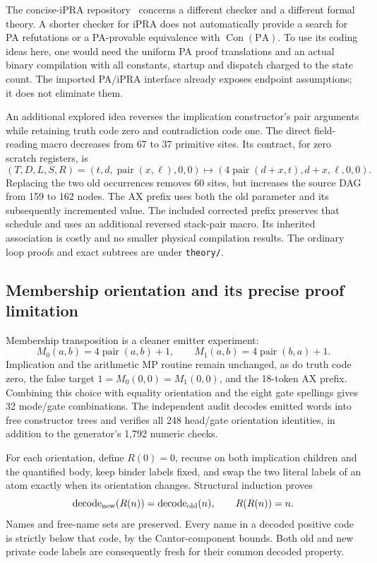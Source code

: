 \documentclass[11pt,letterpaper]{article}
\newcommand{\PA}{\mathrm{PA}}
\newcommand{\Con}{\operatorname{Con}}
\newcommand{\file}[1]{\texttt{\nolinkurl{#1}}}
\newcommand{\pair}{\operatorname{pair}}
\begin{document}
The concise-iPRA repository~\cite{ipra} concerns a different checker and a different
formal theory. A shorter checker for iPRA does not automatically provide a
search for PA refutations or a PA-provable equivalence with $\Con(\PA)$.
To use its coding ideas here, one would need the uniform PA proof
translations and an actual binary compilation with all constants, startup
and dispatch charged to the state count. The imported PA/iPRA interface
already exposes endpoint assumptions; it does not eliminate them.

An additional explored idea reverses the implication constructor's pair
arguments while retaining truth code zero and contradiction code one.
The direct field-reading macro decreases from 67 to 37 primitive sites.
Its contract, for zero scratch registers, is
\[
 (T,D,L,S,R)=(t,d,\pair(x,\ell),0,0)
 \longmapsto (4\pair(d+x,t),d+x,\ell,0,0).
\]
Replacing the two old occurrences removes 60 sites, but increases the source
DAG from 159 to 162 nodes. The AX prefix uses both the old parameter and its
subsequently incremented value. The included corrected prefix preserves that
schedule and uses an additional reversed stack-pair macro. Its inherited
association is costly and no smaller physical compilation results.
The ordinary loop proofs and exact subtrees are under \file{theory/}.

\subsection{Membership orientation and its precise proof limitation}

Membership transposition is a cleaner emitter experiment:
\[
 M_0(a,b)=4\pair(a,b)+1,
 \qquad M_1(a,b)=4\pair(b,a)+1.
\]
Implication and the arithmetic MP routine remain unchanged, as do truth
code zero, the false target $1=M_0(0,0)=M_1(0,0)$, and the 18-token AX
prefix. Combining this choice with equality orientation and the eight gate
spellings gives 32 mode/gate combinations. The independent audit decodes
emitted words into free constructor trees and verifies all 248 head/gate
orientation identities, in addition to the generator's 1,792 numeric checks.

For each orientation, define $R(0)=0$, recurse on both implication children
and the quantified body, keep binder labels fixed, and swap the two literal
labels of an atom exactly when its orientation changes. Structural induction
proves
\[
 \mathrm{decode}_{\rm new}(R(n))=\mathrm{decode}_{\rm old}(n),\qquad
 R(R(n))=n.
\]
Names and free-name sets are preserved. Every name in a decoded positive
code is strictly below that code, by the Cantor-component bounds. Both old
and new private code labels are consequently fresh for their common decoded
property.
\end{document}
